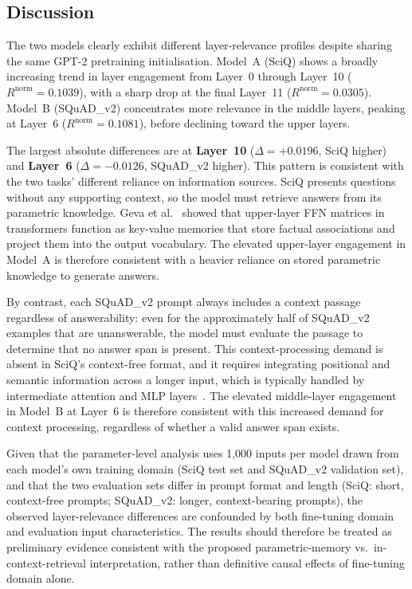 \documentclass[10pt,twocolumn,letterpaper]{article}
\begin{document}
\subsection{Discussion}

The two models clearly exhibit different layer-relevance profiles despite
sharing the same GPT-2 pretraining initialisation.
Model~A (SciQ) shows a broadly increasing trend in layer engagement from
Layer~0 through Layer~10 ($R^{\text{norm}} = 0.1039$), with a sharp drop at
the final Layer~11 ($R^{\text{norm}} = 0.0305$).
Model~B (SQuAD\_v2) concentrates more relevance in the middle layers,
peaking at Layer~6 ($R^{\text{norm}} = 0.1081$), before declining toward the
upper layers.

The largest absolute differences are at \textbf{Layer~10}
($\Delta = +0.0196$, SciQ higher) and \textbf{Layer~6}
($\Delta = -0.0126$, SQuAD\_v2 higher).
This pattern is consistent with the two tasks' different reliance on
information sources.
SciQ presents questions without any supporting context, so the model must
retrieve answers from its parametric knowledge.
Geva et al.~\cite{geva2021ffn} showed that upper-layer FFN matrices in
transformers function as key-value memories that store factual associations
and project them into the output vocabulary.
The elevated upper-layer engagement in Model~A is therefore consistent with
a heavier reliance on stored parametric knowledge to generate answers.

By contrast, each SQuAD\_v2 prompt always includes a context passage
regardless of answerability: even for the approximately half of SQuAD\_v2
examples that are unanswerable, the model must evaluate the passage to
determine that no answer span is present.
This context-processing demand is absent in SciQ's context-free format,
and it requires integrating positional and semantic information across a
longer input, which is typically handled by intermediate attention and MLP
layers~\cite{geva2021ffn}.
The elevated middle-layer engagement in Model~B at Layer~6 is therefore
consistent with this increased demand for context processing, regardless
of whether a valid answer span exists.

Given that the parameter-level analysis uses 1{,}000 inputs per model drawn
from each model's own training domain (SciQ test set and SQuAD\_v2
validation set), and that the two evaluation sets differ in prompt format
and length (SciQ: short, context-free prompts; SQuAD\_v2: longer,
context-bearing prompts), the observed layer-relevance differences are
confounded by both fine-tuning domain and evaluation input characteristics.
The results should therefore be treated as preliminary evidence consistent
with the proposed parametric-memory vs.\ in-context-retrieval interpretation,
rather than definitive causal effects of fine-tuning domain alone.
\end{document}
